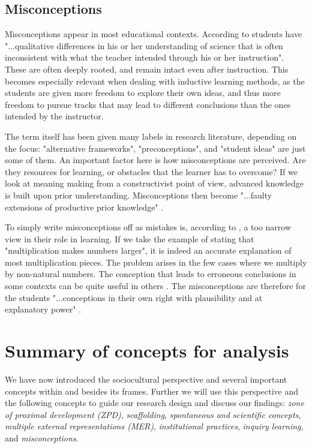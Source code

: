 \subsection{Misconceptions}
Misconceptions appear in most educational contexts. According to \citet[p. 437]{gomez2008elementary} students have "...qualitative differences in his or her understanding of science that is often inconsistent with what the teacher intended through his or her instruction". These are often deeply rooted, and remain intact even after instruction. This becomes especially relevant when dealing with inductive learning methods, as the students are given more freedom to explore their own ideas, and thus more freedom to pursue tracks that may lead to different conclusions than the ones intended by the instructor.

The term itself has been given many labels in research literature, depending on the focus: "alternative frameworks", "preconceptions", and "student ideas" are just some of them. An important factor here is how misconceptions are perceived. Are they resources for learning, or obstacles that the learner has to overcome? If we look at meaning making from a constructivist point of view, advanced knowledge is built upon prior understanding. Misconceptions then become "...faulty extensions of productive prior knowledge" \citep[p. 152]{smith1994misconceptions}.

To simply write misconceptions off as mistakes is, according to \citet{smith1994misconceptions}, a too narrow view in their role in learning. If we take the example of stating that "multiplication makes numbers larger", it is indeed an accurate explanation of most multiplication pieces. The problem arises in the few cases where we multiply by non-natural numbers. The conception that leads to erroneous conclusions in some contexts can be quite useful in others \citep{smith1994misconceptions}. The misconceptions are therefore for the students "...conceptions in their own right with plausibility and at explanatory power" \citetext{\citealp{smith1994misconceptions}, referenced in \citealp{larkin2012misconceptions}, p. 928}. 


\section{Summary of concepts for analysis}
We have now introduced the sociocultural perspective and several important concepts within and besides its frames. Further we will use this perspective and the following concepts to guide our research design and discuss our findings: \emph{zone of proximal development (ZPD)}, \emph{scaffolding}, \emph{spontaneous and scientific concepts}, \emph{multiple external representations (MER)}, \emph{institutional practices}, \emph{inquiry learning}, and \emph{misconceptions}.
